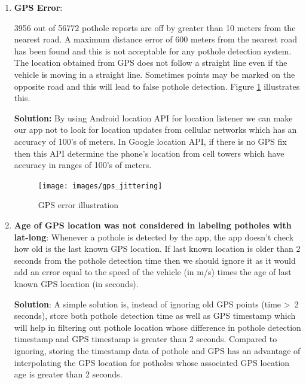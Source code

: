\documentclass[12pt]{report}
\begin{document}
\begin{enumerate}
\item \textbf{GPS Error}:

  3956 out of 56772 pothole reports are off by greater than 10 meters from the
  nearest road. A maximum distance error of 600 meters from the nearest road has
  been found and this is not acceptable for any pothole detection system. The
  location obtained from GPS does not follow a straight line even if the vehicle
  is moving in a straight line. Sometimes points may be marked on the opposite
  road and this will lead to false pothole detection. Figure \ref{gps_jittering}
  illustrates this.

  \textbf{Solution:} By using Android location API for location listener we can
  make our app not to look for location updates from cellular networks which has
  an accuracy of 100's of meters. In Google location API, if there is no GPS fix
  then this API determine the phone's location from cell towers which have
  accuracy in ranges of 100's of meters.

\begin{figure}[h]
    \centering
    \texttt{[image: images/gps\_jittering]}
    \caption{GPS error illustration}
    \label{gps_jittering}
  \end{figure}


\item \textbf{Age of GPS location was not considered in labeling potholes with
    lat-long}: Whenever a pothole is detected by the app, the app doesn't check
  how old is the last known GPS location. If last known location is older than 2
  seconds from the pothole detection time then we should ignore it as it would
  add an error equal to the speed of the vehicle (in m/s) times the age of last
  known GPS location (in seconds).
  
  \textbf{Solution}: A simple solution is, instead of ignoring old GPS points
  (time \textgreater \ 2 seconds), store both pothole detection time as well as
  GPS timestamp which will help in filtering out pothole location whose
  difference in pothole detection timestamp and GPS timestamp is greater than 2
  seconds. Compared to ignoring, storing the timestamp data of pothole and GPS
  has an advantage of interpolating the GPS location for potholes whose
  associated GPS location age is greater than 2 seconds.


\end{enumerate}
\end{document}
